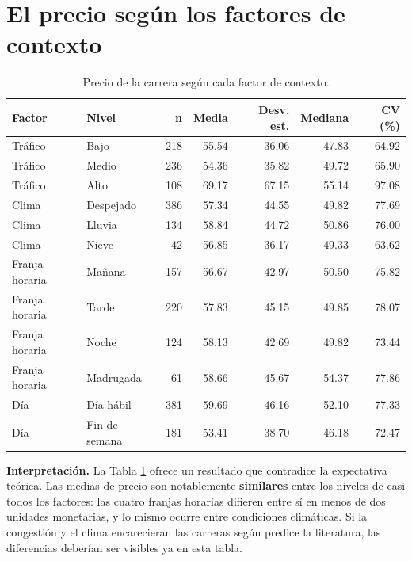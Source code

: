 \documentclass[
]{book}
\begin{document}
\section{El precio según los factores de contexto}\label{el-precio-seguxfan-los-factores-de-contexto}

\begin{table}

\caption{\label{tab:desc-factores}Precio de la carrera según cada factor de contexto.}
\centering
\begin{tabular}[t]{l|l|r|r|r|r|r}
\hline
Factor & Nivel & n & Media & Desv. est. & Mediana & CV (\%)\\
\hline
Tráfico & Bajo & 218 & 55.54 & 36.06 & 47.83 & 64.92\\
\hline
Tráfico & Medio & 236 & 54.36 & 35.82 & 49.72 & 65.90\\
\hline
Tráfico & Alto & 108 & 69.17 & 67.15 & 55.14 & 97.08\\
\hline
Clima & Despejado & 386 & 57.34 & 44.55 & 49.82 & 77.69\\
\hline
Clima & Lluvia & 134 & 58.84 & 44.72 & 50.86 & 76.00\\
\hline
Clima & Nieve & 42 & 56.85 & 36.17 & 49.33 & 63.62\\
\hline
Franja horaria & Mañana & 157 & 56.67 & 42.97 & 50.50 & 75.82\\
\hline
Franja horaria & Tarde & 220 & 57.83 & 45.15 & 49.85 & 78.07\\
\hline
Franja horaria & Noche & 124 & 58.13 & 42.69 & 49.82 & 73.44\\
\hline
Franja horaria & Madrugada & 61 & 58.66 & 45.67 & 54.37 & 77.86\\
\hline
Día & Día hábil & 381 & 59.69 & 46.16 & 52.10 & 77.33\\
\hline
Día & Fin de semana & 181 & 53.41 & 38.70 & 46.18 & 72.47\\
\hline
\end{tabular}
\end{table}

\textbf{Interpretación.} La Tabla \ref{tab:desc-factores} ofrece un resultado que contradice la
expectativa teórica. Las medias de precio son notablemente \textbf{similares} entre los niveles de
casi todos los factores: las cuatro franjas horarias difieren entre sí en menos de dos
unidades monetarias, y lo mismo ocurre entre condiciones climáticas. Si la congestión y el
clima encarecieran las carreras según predice la literatura, las diferencias deberían ser
visibles ya en esta tabla.
\end{document}
